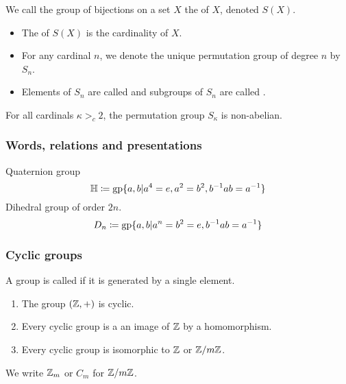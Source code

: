 \begin{definition}
We call the group of bijections on a set $X$ the  of $X$, denoted $S(X)$.
\begin{itemize}
\item The  of $S(X)$ is the cardinality of $X$.
\item For any cardinal $n$, we denote the unique permutation group of degree $n$ by $S_n$.
\item Elements of $S_n$ are called  and subgroups of $S_n$ are called .
\end{itemize}
\end{definition}
\begin{lemma}
For all cardinals $\kappa >_c 2$, the permutation group $S_\kappa$ is non-abelian.
\end{lemma}

\subsubsection{Words, relations and presentations}

\begin{example}
Quaternion group
\[ \mathbb{H} \coloneqq \operatorname{gp}\{a,b|a^4=e, a^2=b^2, b^{-1}ab = a^{-1}\} \]
Dihedral group of order $2n$.
\[ D_n \coloneqq \operatorname{gp}\{ a,b | a^n=b^2=e, b^{-1}ab = a^{-1} \} \]
\end{example}

\subsubsection{Cyclic groups}
\begin{definition}
A group is called  if it is generated by a single element.
\end{definition}
 \begin{lemma}
\begin{enumerate}
\item The group $(\mathbb{Z}, +)$ is cyclic.
\item Every cyclic group is a an image of $\mathbb{Z}$ by a homomorphism.
\item Every cyclic group is isomorphic to $\mathbb{Z}$ or $\mathbb{Z}/m\mathbb{Z}$.
\end{enumerate}
\end{lemma}
We write $\mathbb{Z}_m$ or $C_m$ for $\mathbb{Z}/m\mathbb{Z}$.
 
